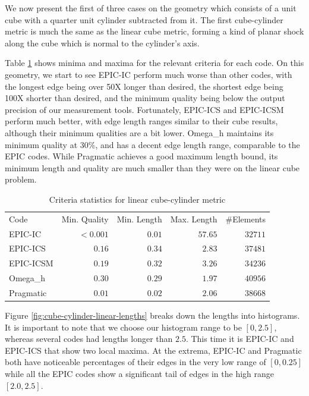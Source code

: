 \documentclass[3p,times,procedia,number]{elsarticle}
\begin{document}
We now present the first of three cases on the geometry
which consists of a unit cube with a quarter unit cylinder
subtracted from it.
The first cube-cylinder metric is much the same as the
linear cube metric, forming a kind of planar shock along
the cube which is normal to the cylinder's axis.

Table \ref{tab:cube-cylinder-linear-stats} shows minima
and maxima for the relevant criteria for each code.
On this geometry, we start to see EPIC-IC perform much
worse than other codes, with the longest edge being over
50X longer than desired, the shortest edge being
100X shorter than desired, and the minimum quality being
below the output precision of our measurement tools.
Fortunately, EPIC-ICS and EPIC-ICSM perform much better,
with edge length ranges similar to their cube results,
although their minimum qualities are a bit lower.
Omega\_h maintains its minimum quality at 30\%, and
has a decent edge length range, comparable to the EPIC codes.
While Pragmatic achieves a good maximum length bound,
its minimum length and quality are much smaller than they
were on the linear cube problem.

\begin{table}
\caption{Criteria statistics for linear cube-cylinder metric}
\label{tab:cube-cylinder-linear-stats}
\begin{tabular}{lrrrr}
Code & Min. Quality & Min. Length & Max. Length & \#Elements\\
EPIC-IC    &$<0.001$&       $0.01$&      $57.65$&    $32711$\\
EPIC-ICS   &  $0.16$&       $0.34$&      $ 2.83$&    $37481$\\
EPIC-ICSM  &  $0.19$&       $0.32$&      $ 3.26$&    $34236$\\
Omega\_h   &  $0.30$&       $0.29$&      $ 1.97$&    $40956$\\
Pragmatic  &  $0.01$&       $0.02$&      $ 2.06$&    $38668$\\
\end{tabular}
\end{table}

Figure \ref{fig:cube-cylinder-linear-lengths} breaks down the
lengths into histograms.
It is important to note that we choose our histogram range to
be $[0,2.5]$, whereas several codes had lengths longer than $2.5$.
This time it is EPIC-IC and EPIC-ICS that show two local maxima.
At the extrema, EPIC-IC and Pragmatic both have noticeable
percentages of their edges in the very low range of $[0,0.25]$
while all the EPIC codes show a significant tail of edges
in the high range $[2.0,2.5]$.
\end{document}
